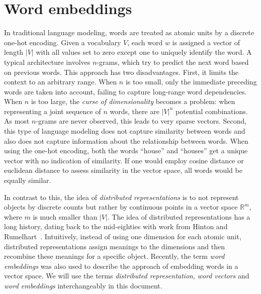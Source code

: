 \documentclass[
        a4paper,
        titlepage,
        twoside,
        parskip
        ]{scrbook}
\theoremstyle{break}
\begin{document}
\section{Word embeddings}

In traditional language modeling, words are treated as atomic units by a discrete one-hot encoding.
Given a vocabulary $V$, each word $w$ is assigned a vector of length $|V|$ with all values set to zero except one to uniquely identify the word.
A typical architecture involves $n$-grams, which try to predict the next word based on previous words.
This approach has two disadvantages.
First, it limits the context to an arbitrary range.
When $n$ is too small, only the immediate preceding words are taken into account, failing to capture long-range word dependencies.
When $n$ is too large, the \emph{curse of dimensionality} becomes a problem: when representing a joint sequence of $n$ words, there are $|V|^n$ potential combinations.
As most $n$-grams are never observed, this leads to very sparse vectors.
Second, this type of language modeling does not capture similarity between words and also does not capture information about the relationship between words.
When using the one-hot encoding, both the words ``house'' and ``houses'' get a unique vector with no indication of similarity.
If one would employ cosine distance or euclidean distance to assess similarity in the vector space, all words would be equally similar.

In contrast to this, the idea of \emph{distributed representations} is to not represent objects by discrete counts but rather by continuous points in a vector space $\mathbb{R}^m$, where $m$ is much smaller than $|V|$.
The idea of distributed representations has a long history, dating back to the mid-eighties with work from Hinton and Rumelhart~\cite{Hinton1986,Rumelhart1988}.
Intuitively, instead of using one dimension for each atomic unit, distributed representations assign meanings to the dimensions and then recombine these meanings for a specific object.
Recently, the term \emph{word embeddings} was also used to describe the approach of embedding words in a vector space.
We will use the terms \emph{distributed representation}, \emph{word vectors} and \emph{word embeddings} interchangeably in this document.
\end{document}
